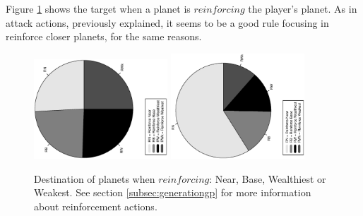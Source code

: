 \documentclass[conference]{IEEEtran}
\begin{document}
Figure \ref{figura:tarta_reinforcing} shows the target when a planet is $reinforcing$ the player's planet. As in attack actions, previously explained, it seems to be a good rule focusing in reinforce closer planets, for the same reasons.
\begin{figure}[htb]
\tiny
\begin{center}

    \includegraphics[trim=1cm 7cm 1cm 7cm, clip=true,width=5cm,angle=-90]{./imags/distribution_initial_reinforce.eps}
    \includegraphics[trim=1cm 7cm 1cm 7cm, clip=true,width=5cm,angle=-90]{./imags/distribution_final_reinforce.eps}

\end{center}
\caption{Destination of planets when $reinforcing$: Near, Base, Wealthiest or Weakest. See section \ref{subsec:generationgp} for more information about reinforcement actions.}
\label{figura:tarta_reinforcing}
\end{figure}
\end{document}
